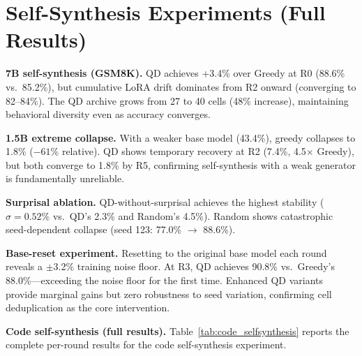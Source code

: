 \documentclass{article}
\theoremstyle{plain}
\theoremstyle{remark}
\begin{document}
\section{Self-Synthesis Experiments (Full Results)}
\label{sec:app_selfsynth}

\textbf{7B self-synthesis (GSM8K).}
QD achieves +3.4\% over Greedy at R0 (88.6\% vs.\ 85.2\%), but cumulative LoRA drift dominates from R2 onward (converging to 82--84\%).
The QD archive grows from 27 to 40 cells (48\% increase), maintaining behavioral diversity even as accuracy converges.

\textbf{1.5B extreme collapse.}
With a weaker base model (43.4\%), greedy collapses to 1.8\% ($-61\%$ relative).
QD shows temporary recovery at R2 (7.4\%, 4.5$\times$ Greedy), but both converge to 1.8\% by R5, confirming self-synthesis with a weak generator is fundamentally unreliable.

\textbf{Surprisal ablation.}
QD-without-surprisal achieves the highest stability ($\sigma{=}0.52\%$ vs.\ QD's 2.3\% and Random's 4.5\%).
Random shows catastrophic seed-dependent collapse (seed 123: 77.0\% $\to$ 88.6\%).

\textbf{Base-reset experiment.}
Resetting to the original base model each round reveals a $\pm$3.2\% training noise floor.
At R3, QD achieves 90.8\% vs.\ Greedy's 88.0\%---exceeding the noise floor for the first time.
Enhanced QD variants provide marginal gains but zero robustness to seed variation, confirming cell deduplication as the core intervention.

\textbf{Code self-synthesis (full results).}
Table~\ref{tab:code_selfsynthesis} reports the complete per-round results for the code self-synthesis experiment.
\end{document}
